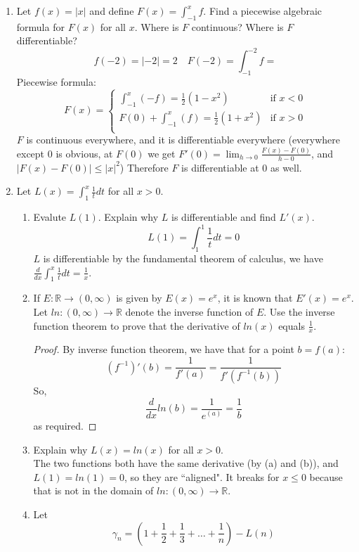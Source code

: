 \documentclass[hidelinks,12pt]{article}
\renewcommand{\leq}{\leqslant}
\newcommand{\R}{\mathbb{R}}
\begin{document}
\begin{enumerate}
\begin{enumerate}
        \end{enumerate}
    \item Let $f(x)=|x|$ and define $F(x)=\int_{-1}^xf$. Find a piecewise algebraic formula for $F(x)$ for all $x$. Where is $F$ continuous? Where is $F$ differentiable?
        \[f(-2)=|-2|=2\quad F(-2)=\int_{-1}^{-2}f=\]
        Piecewise formula:
        \[F(x)=\begin{cases}
            \int_{-1}^{x}(-f)=\frac{1}{2}(1-x^2) & \text{if }x<0\\
            F(0)+\int_{-1}^{x}(f)=\frac{1}{2}(1+x^2) & \text{if }x>0\\
        \end{cases}\]
        $F$ is continuous everywhere, and it is differentiable everywhere (everywhere except 0 is obvious, at $F(0)$ we get $F'(0)=\lim_{h\to0}\frac{F(x)-F(0)}{h-0}$, and  $|F(x)-F(0)|\leq|x|^2$) Therefore $F$ is differentiable at 0 as well. 
    \item Let $L(x)=\int_1^x\frac{1}tdt$ for all $x>0$.
        \begin{enumerate}
            \item Evalute $L(1)$. Explain why $L$ is differentiable and find $L'(x)$.
                \[L(1)=\int_1^1\frac{1}tdt=0\]
                $L$ is differentiable by the fundamental theorem of calculus, we have $\frac{d}{dx}\int_1^x\frac{1}tdt=\frac{1}{x}$.
            \item If $E:\R\to(0,\infty)$ is given by $E(x)=e^x$, it is known that $E'(x)=e^x$. Let $ln:(0,\infty)\to\R$ denote the inverse function of $E$. Use the inverse function theorem to prove that the derivative of $ln(x)$ equals $\frac{1}x$.
                \begin{proof}
                    By inverse function theorem, we have that for a point $b=f(a)$:
                    \[(f^{-1})'(b)=\frac{1}{f'(a)}=\frac{1}{f'(f^{-1}(b))}\]
                    So,
                    \[\frac{d}{dx}ln(b)=\frac{1}{e^(a)}=\frac{1}{b}\]
                    as required.
                \end{proof}
            \item Explain why $L(x)=ln(x)$ for all $x>0$.\\
                The two functions both have the same derivative (by (a) and (b)), and $L(1)=ln(1)=0$, so they are ``aligned". It breaks for $x\leq0$ because that is not in the domain of $ln:(0,\infty)\to\R$.
            \item Let
                \[\gamma_n=(1+\frac{1}2+\frac{1}3+\dots+\frac{1}{n})-L(n)\]

\end{enumerate}
\end{enumerate}
\end{document}
